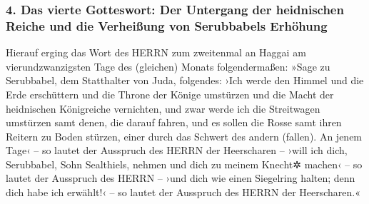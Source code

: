 \hypertarget{das-vierte-gotteswort-der-untergang-der-heidnischen-reiche-und-die-verheiuxdfung-von-serubbabels-erhuxf6hung}{%
\subsubsection{4. Das vierte Gotteswort: Der Untergang der heidnischen
Reiche und die Verheißung von Serubbabels
Erhöhung}\label{das-vierte-gotteswort-der-untergang-der-heidnischen-reiche-und-die-verheiuxdfung-von-serubbabels-erhuxf6hung}}

 Hierauf erging das Wort des HERRN zum zweitenmal an
Haggai am vierundzwanzigsten Tage des (gleichen) Monats folgendermaßen:
 »Sage zu Serubbabel, dem Statthalter von Juda,
folgendes: ›Ich werde den Himmel und die Erde erschüttern
 und die Throne der Könige umstürzen und die Macht der
heidnischen Königreiche vernichten, und zwar werde ich die Streitwagen
umstürzen samt denen, die darauf fahren, und es sollen die Rosse samt
ihren Reitern zu Boden stürzen, einer durch das Schwert des andern
(fallen).  An jenem Tage‹ -- so lautet der Ausspruch des
HERRN der Heerscharen -- ›will ich dich, Serubbabel, Sohn Sealthiels,
nehmen und dich zu meinem Knecht✲ machen‹ -- so lautet der Ausspruch des
HERRN -- ›und dich wie einen Siegelring halten; denn dich habe ich
erwählt!‹ -- so lautet der Ausspruch des HERRN der Heerscharen.«
